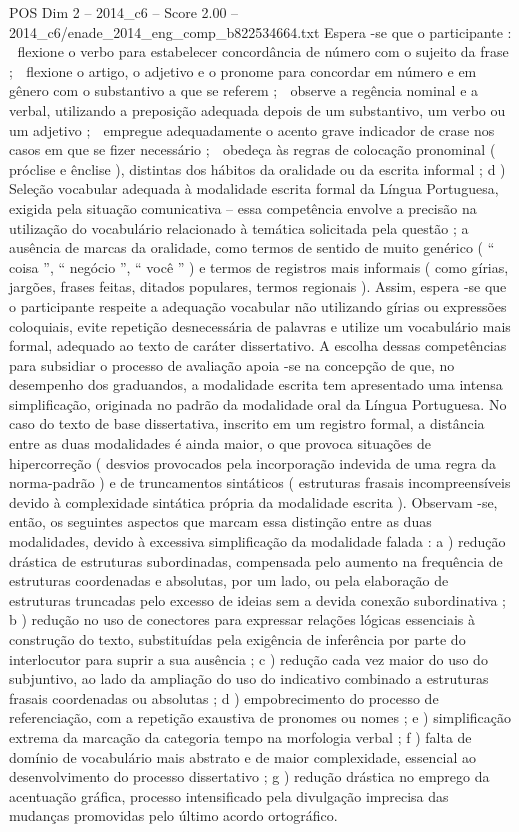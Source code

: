 \begin{textsample}{POS Dim 2 – 2014\_c6 – Score 2.00 – 2014\_c6/enade\_2014\_eng\_comp\_b822534664.txt}
Espera -se que o participante :  flexione o verbo para estabelecer concordância de número com o sujeito da frase ;  flexione o artigo, o adjetivo e o pronome para concordar em número e em gênero com o substantivo a que se referem ;  observe a regência nominal e a verbal, utilizando a preposição adequada depois de um substantivo, um verbo ou um adjetivo ;  empregue adequadamente o acento grave indicador de crase nos casos em que se fizer necessário ;  obedeça às regras de colocação pronominal ( próclise e ênclise ), distintas dos hábitos da oralidade ou da escrita informal ; d ) Seleção vocabular adequada à modalidade escrita formal da Língua Portuguesa, exigida pela situação comunicativa – essa competência envolve a precisão na utilização do vocabulário relacionado à temática solicitada pela questão ; a ausência de marcas da oralidade, como termos de sentido de muito genérico ( “ coisa ”, “ negócio ”, “ você ” ) e termos de registros mais informais ( como gírias, jargões, frases feitas, ditados populares, termos regionais ).
Assim, espera -se que o participante respeite a adequação vocabular não utilizando gírias ou expressões coloquiais, evite repetição desnecessária de palavras e utilize um vocabulário mais formal, adequado ao texto de caráter dissertativo.
A escolha dessas competências para subsidiar o processo de avaliação apoia -se na concepção de que, no desempenho dos graduandos, a modalidade escrita tem apresentado uma intensa simplificação, originada no padrão da modalidade oral da Língua Portuguesa.
No caso do texto de base dissertativa, inscrito em um registro formal, a distância entre as duas modalidades é ainda maior, o que provoca situações de hipercorreção ( desvios provocados pela incorporação indevida de uma regra da norma-padrão ) e de truncamentos sintáticos ( estruturas frasais incompreensíveis devido à complexidade sintática própria da modalidade escrita ).
Observam -se, então, os seguintes aspectos que marcam essa distinção entre as duas modalidades, devido à excessiva simplificação da modalidade falada : a ) redução drástica de estruturas subordinadas, compensada pelo aumento na frequência de estruturas coordenadas e absolutas, por um lado, ou pela elaboração de estruturas truncadas pelo excesso de ideias sem a devida conexão subordinativa ; b ) redução no uso de conectores para expressar relações lógicas essenciais à construção do texto, substituídas pela exigência de inferência por parte do interlocutor para suprir a sua ausência ; c ) redução cada vez maior do uso do subjuntivo, ao lado da ampliação do uso do indicativo combinado a estruturas frasais coordenadas ou absolutas ; d ) empobrecimento do processo de referenciação, com a repetição exaustiva de pronomes ou nomes ; e ) simplificação extrema da marcação da categoria tempo na morfologia verbal ; f ) falta de domínio de vocabulário mais abstrato e de maior complexidade, essencial ao desenvolvimento do processo dissertativo ; g ) redução drástica no emprego da acentuação gráfica, processo intensificado pela divulgação imprecisa das mudanças promovidas pelo último acordo ortográfico.

\end{textsample}
